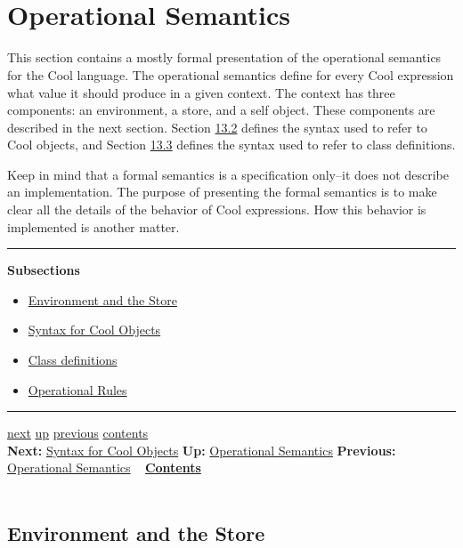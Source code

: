 \documentclass[]{article}
\begin{document}
\section{\\ Operational Semantics}

This section contains a mostly formal presentation of the operational
semantics for the Cool language. The operational semantics define for
every Cool expression what value it should produce in a given context.
The context has three components: an environment, a store, and a self
object. These components are described in the next section. Section
\href{node46.html\#objectsyntax}{13.2} defines the syntax used to refer
to Cool objects, and Section \href{node47.html\#classdefs}{13.3} defines
the syntax used to refer to class definitions.

Keep in mind that a formal semantics is a specification only--it does
not describe an implementation. The purpose of presenting the formal
semantics is to make clear all the details of the behavior of Cool
expressions. How this behavior is implemented is another matter.

\begin{center}\rule{3in}{0.4pt}\end{center}

\textbf{Subsections}

\begin{itemize}
\itemsep1pt\parskip0pt
\item
  \href{node45.html}{Environment and the Store}
\item
  \href{node46.html}{Syntax for Cool Objects}
\item
  \href{node47.html}{Class definitions}
\item
  \href{node48.html}{Operational Rules}
\end{itemize}

\begin{center}\rule{3in}{0.4pt}\end{center}

\href{node46.html}{next} \href{node44.html}{up}
\href{node44.html}{previous} \href{node1.html}{contents} \\
\textbf{Next:} \href{node46.html}{Syntax for Cool Objects} \textbf{Up:}
\href{node44.html}{Operational Semantics} \textbf{Previous:}
\href{node44.html}{Operational Semantics} ~
\textbf{\href{node1.html}{Contents}} \\ \\

\subsection{Environment and the Store}
\end{document}
